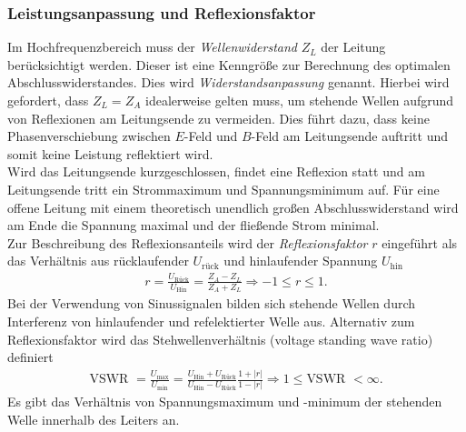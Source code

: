 \documentclass[a4paper,twoside,final]{article}
\begin{document}
\subsubsection{Leistungsanpassung und Reflexionsfaktor}
Im Hochfrequenzbereich muss der \textit{Wellenwiderstand} $Z_L$ der Leitung berücksichtigt werden. Dieser ist eine Kenngröße zur Berechnung des optimalen Abschlusswiderstandes. Dies wird \textit{Widerstandsanpassung} genannt. Hierbei wird gefordert, dass $Z_L = Z_A$ idealerweise gelten muss, um stehende Wellen aufgrund von Reflexionen am Leitungsende zu vermeiden. Dies führt dazu, dass keine Phasenverschiebung zwischen $E$-Feld und $B$-Feld am Leitungsende auftritt und somit keine Leistung reflektiert wird.\\
Wird das Leitungsende kurzgeschlossen, findet eine Reflexion statt und am Leitungsende tritt ein Strommaximum und Spannungsminimum auf. Für eine offene Leitung mit einem theoretisch unendlich großen Abschlusswiderstand wird am Ende die Spannung maximal und der fließende Strom minimal.\\
Zur Beschreibung des Reflexionsanteils wird der \textit{Reflexionsfaktor} $r$ eingeführt als das Verhältnis aus rücklaufender $U_\text{rück}$ und hinlaufender Spannung $U_\text{hin}$
\begin{align}
  r=\frac{U_{\text{Rück}}}{U_{\text{Hin}}}=\frac{Z_{A}-Z_{L}}{Z_{A}+Z_{L}} \Rightarrow-1 \leq r \leq 1.
\end{align}
Bei der Verwendung von Sinussignalen bilden sich stehende Wellen durch Interferenz von hinlaufender und refelektierter Welle aus. Alternativ zum Reflexionsfaktor wird das Stehwellenverhältnis  (voltage standing wave ratio) definiert
\begin{align}
  \text{VSWR }=\frac{U_{\max }}{U_{\min }}= \frac{U_\text{Hin}+U_\text{Rück}}{U_\text{Hin}-U_\text{Rück}}\frac{1+|r|}{1-|r|} \Rightarrow 1 \leq \text{VSWR }<\infty.
\end{align}
Es gibt das Verhältnis von Spannungsmaximum und -minimum der stehenden Welle innerhalb des Leiters an.
\end{document}
